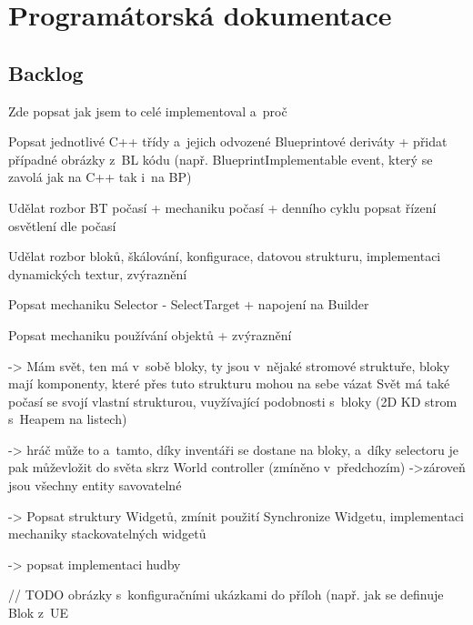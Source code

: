 
\chapter{Programátorská dokumentace}






\section{Backlog}

Zde popsat jak jsem to celé implementoval a~proč


Popsat jednotlivé C++ třídy a~jejich odvozené Blueprintové deriváty + přidat případné obrázky z~BL kódu (např. BlueprintImplementable event, který se zavolá jak na C++ tak i~na BP) 

Udělat rozbor BT počasí + mechaniku počasí + denního cyklu
popsat řízení osvětlení dle počasí

Udělat rozbor bloků, škálování, konfigurace, datovou strukturu, implementaci dynamických textur, zvýraznění

Popsat mechaniku Selector - SelectTarget + napojení na Builder

Popsat mechaniku používání objektů + zvýraznění

-> Mám svět, ten má v~sobě bloky, ty jsou v~nějaké stromové struktuře, bloky mají komponenty, které přes tuto strukturu mohou na sebe vázat
Svět má také počasí se svojí vlastní strukturou, vuyžívající podobnosti s~bloky (2D KD strom s~Heapem na listech)

-> hráč může to a~tamto, díky inventáři se dostane na bloky, a~díky selectoru je pak můževložit do světa skrz World controller (zmíněno v~předchozím)
->zároveň jsou všechny entity savovatelné 


-> Popsat struktury Widgetů, zmínit použití Synchronize Widgetu, implementaci mechaniky stackovatelných widgetů

-> popsat implementaci hudby




// TODO obrázky s~konfiguračními ukázkami do příloh (např. jak se definuje Blok z~UE


